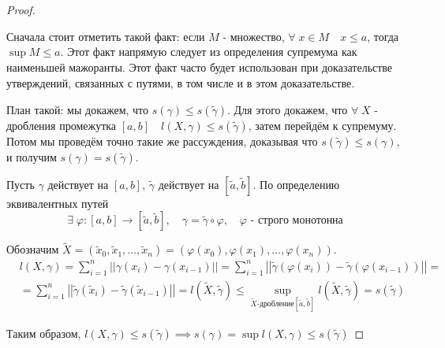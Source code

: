 \documentclass[../main.tex]{subfiles}
\begin{document}
\begin{proof}
    
    ~
    
    Сначала стоит отметить такой факт: если \( M\) - множество, \( \forall \; x \in M\quad x \leq a\), тогда \( \sup\limits_{ } M \leq a\). Этот факт напрямую следует из определения супремума как наименьшей мажоранты. Этот факт часто будет использован
    при доказательстве утверждений, связанных с путями, в том числе и в этом доказательстве. 
    
    План такой: мы докажем, что \( s\left( \gamma \right) \leq s\left( \tilde{ \gamma }\right)\). 
    Для этого докажем, что \( \forall \; X\) - дробления промежутка \( \left[ a,b\right]\quad l \left( X, \gamma \right) \leq s\left( \tilde{ \gamma }\right)\), затем перейдём к супремуму. Потом мы проведём точно такие же рассуждения, доказывая что \( s\left( \tilde{ \gamma }\right) \leq s\left( \gamma \right)\), и получим \( s\left( \gamma \right)=s\left( \tilde{ \gamma }\right)\).

    Пусть \( \gamma \) действует на \( \left[ a,b\right]\), \( \tilde{ \gamma }\) действует на \( [ \tilde{ a}, \tilde{ b}]\). По определению эквивалентных путей 
    \[ \exists \; \varphi : \left[ a,b\right] \longrightarrow [ \tilde{ a}, \tilde{ b}],\quad \gamma = \tilde{ \gamma }\circ \varphi ,\quad \varphi \text{ - строго монотонна}\]

    Обозначим \( \tilde{ X}=( \tilde{ x}_0, \tilde{ x}_1, \dots, \tilde{ x}_n)=( \varphi \left( x_0\right), \varphi \left( x_1\right), \dots, \varphi \left( x_n\right))\).
    \begin{equation*}
        \begin{aligned}
            &l \left( X, \gamma \right)= \sum\limits_{ i=1}^{ n} \left| \left| \gamma \left( x_i\right)- \gamma \left( x_{i-1}\right)\right|\right|= \sum\limits_{ i=1}^{ n} \left| \left| \tilde\gamma \left( \varphi \left( x_i\right)\right)- \tilde{ \gamma }\left( \varphi \left( x_{i-1}\right)\right)\right|\right|=\\ 
            &= \sum\limits_{ i=1}^{ n} \left| \left| \tilde{ \gamma }\left( \tilde{ x}_i\right)- \tilde{ \gamma }\left( \tilde{ x}_{i-1}\right)\right|\right|=l ( \tilde{ X}, \tilde{ \gamma }) \leq \sup\limits_{ \tilde{ X}\text{-дробление}[ \tilde{ a}, \tilde{ b}]} l ( \tilde{ X}, \tilde{ \gamma })=s\left( \tilde{ \gamma }\right)
        \end{aligned}
    \end{equation*}

    Таким образом, \( l \left( X, \gamma \right) \leq s\left( \tilde{ \gamma }\right) \implies s\left( \gamma \right)= \sup\limits_{ } l \left( X, \gamma \right) \leq s\left( \tilde{ \gamma }\right)\) 


\end{proof}
\end{document}
